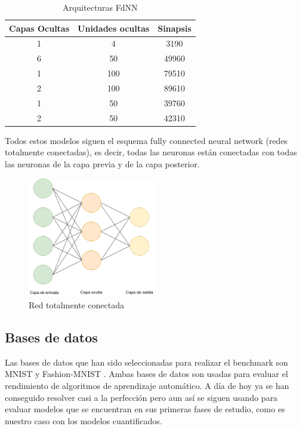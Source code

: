\begin{table}[H]
    \renewcommand{\arraystretch}{1.5}
    \centering
    \begin{tabular}{ccc}
        \toprule[0.75mm]
        {\textbf{Capas Ocultas}} & \textbf{Unidades ocultas} & \textbf{Sinapsis} \\
        \hline
        1 & 4 & 3190\\
        \hline
        6 & 50 & 49960\\
        \hline
        1 & 100 & 79510\\
        \hline
        2 & 100 & 89610 \\
        \hline
        1 & 50 & 39760 \\
        \hline
        2 & 50 &  42310\\
        \bottomrule[0.75mm]
    \end{tabular}
    \caption{Arquitecturas FdNN}
\end{table}

Todos estos modelos siguen el esquema fully connected neural network (redes totalmente conectadas), es decir, todas las neuronas están conectadas con todas las neuronas de la capa previa y de la capa posterior.


\begin{figure}[H]
\centering
\includegraphics[width=0.5\textwidth]{imagenes/fdnn.drawio.png} 
\caption{Red totalmente conectada}
\end{figure}

\subsection{Bases de datos}

Las bases de datos que han sido seleccionadas para realizar el benchmark son MNIST \cite{7966217} y Fashion-MNIST \cite{DBLP:journals/corr/abs-1708-07747}. Ambas bases de datos son usadas para evaluar el rendimiento de algoritmos de aprendizaje automático. A día de hoy ya se han conseguido resolver casi a la perfección pero aun así se siguen usando para evaluar modelos que se encuentran en sus primeras fases de estudio, como es nuestro caso con los modelos cuantificados.  

